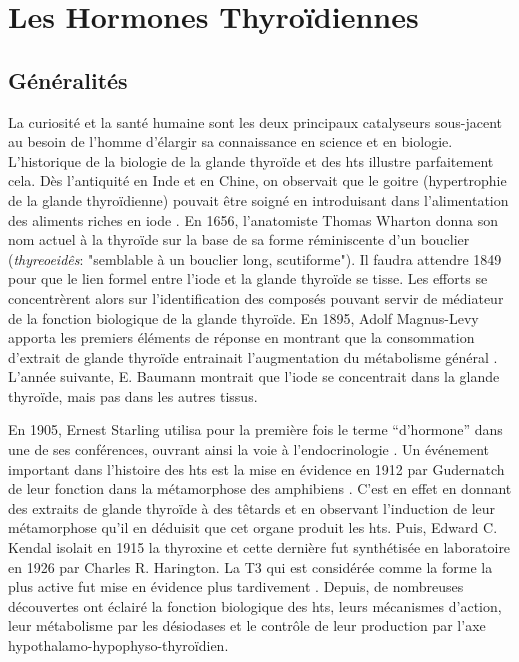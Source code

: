 \documentclass[../main.tex]{subfiles}
\begin{document}
\chapter{Les Hormones Thyroïdiennes}


\section{Généralités}

La curiosité et la santé humaine sont les deux principaux catalyseurs sous-jacent au besoin de l'homme d'élargir sa connaissance en science et en biologie.
L'historique de la biologie de la glande thyroïde et des \glspl{ht} illustre parfaitement cela.
Dès l'antiquité en Inde et en Chine, on observait que le goitre (hypertrophie de la glande thyroïdienne) pouvait être soigné en introduisant dans l'alimentation des aliments riches en iode \citep{Niazi2011}.
En 1656, l'anatomiste Thomas Wharton donna son nom actuel à la thyroïde sur la base de sa forme réminiscente d'un bouclier (\textit{thyreoeidês}: "semblable à un bouclier long, scutiforme").
Il faudra attendre 1849 pour que le lien formel entre l'iode et la glande thyroïde se tisse.
Les efforts se concentrèrent alors sur l'identification des composés pouvant servir de médiateur de la fonction biologique de la glande thyroïde.
En 1895, Adolf Magnus-Levy apporta les premiers éléments de réponse en montrant que la consommation d'extrait de glande thyroïde entrainait l'augmentation du métabolisme général \citep{Magnus-Levy1895}.
L'année suivante, E. Baumann montrait que l'iode se concentrait dans la glande thyroïde, mais pas dans les autres tissus\citep{Baumann1896}.
\par
En 1905, Ernest Starling utilisa pour la première fois le terme ``d'hormone'' dans une de ses conférences, ouvrant ainsi la voie à l'endocrinologie .
Un événement important dans l'histoire des \glspl{ht} est la mise en évidence en 1912 par Gudernatch de leur fonction dans la métamorphose des amphibiens \citep{Gudernatsch1912}.
C'est en effet en donnant des extraits de glande thyroïde à des têtards et en observant l'induction de leur métamorphose qu'il en déduisit que cet organe produit les \glspl{ht}.
Puis, Edward C. Kendal isolait en 1915 la thyroxine et cette dernière fut synthétisée en laboratoire en 1926 par Charles R. Harington.
La T3 qui est considérée comme la forme la plus active fut mise en évidence plus tardivement \citep{Gross1952,Roche1952}.
Depuis, de nombreuses découvertes ont éclairé la fonction biologique des \glspl{ht}, leurs mécanismes d'action, leur métabolisme par les désiodases et le contrôle de leur production par l'axe hypothalamo-hypophyso-thyroïdien.
\end{document}
